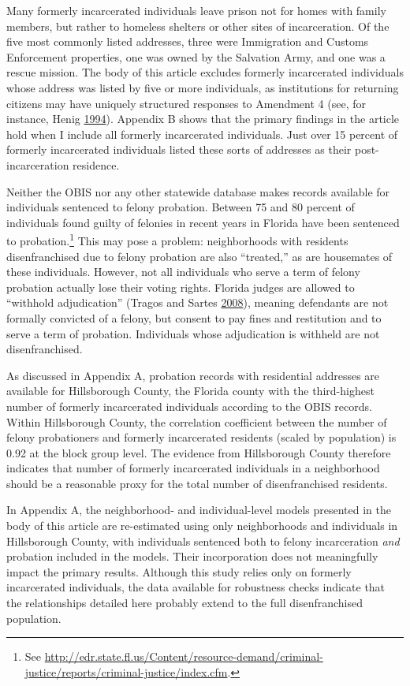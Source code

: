 \documentclass[
  12pt,
]{article}
\begin{document}
Many formerly incarcerated individuals leave prison not for homes with family members, but rather to homeless shelters or other sites of incarceration. Of the five most commonly listed addresses, three were Immigration and Customs Enforcement properties, one was owned by the Salvation Army, and one was a rescue mission. The body of this article excludes formerly incarcerated individuals whose address was listed by five or more individuals, as institutions for returning citizens may have uniquely structured responses to Amendment 4 (see, for instance, Henig \protect\hyperlink{ref-Henig1994}{1994}). Appendix B shows that the primary findings in the article hold when I include all formerly incarcerated individuals. Just over 15 percent of formerly incarcerated individuals listed these sorts of addresses as their post-incarceration residence.

Neither the OBIS nor any other statewide database makes records available for individuals sentenced to felony probation. Between 75 and 80 percent of individuals found guilty of felonies in recent years in Florida have been sentenced to probation.\footnote{See \url{http://edr.state.fl.us/Content/resource-demand/criminal-justice/reports/criminal-justice/index.cfm}.} This may pose a problem: neighborhoods with residents disenfranchised due to felony probation are also ``treated,'' as are housemates of these individuals. However, not all individuals who serve a term of felony probation actually lose their voting rights. Florida judges are allowed to ``withhold adjudication'' (Tragos and Sartes \protect\hyperlink{ref-Tragos2008}{2008}), meaning defendants are not formally convicted of a felony, but consent to pay fines and restitution and to serve a term of probation. Individuals whose adjudication is withheld are not disenfranchised.

As discussed in Appendix A, probation records with residential addresses are available for Hillsborough County, the Florida county with the third-highest number of formerly incarcerated individuals according to the OBIS records. Within Hillsborough County, the correlation coefficient between the number of felony probationers and formerly incarcerated residents (scaled by population) is 0.92 at the block group level. The evidence from Hillsborough County therefore indicates that number of formerly incarcerated individuals in a neighborhood should be a reasonable proxy for the total number of disenfranchised residents.

In Appendix A, the neighborhood- and individual-level models presented in the body of this article are re-estimated using only neighborhoods and individuals in Hillsborough County, with individuals sentenced both to felony incarceration \emph{and} probation included in the models. Their incorporation does not meaningfully impact the primary results. Although this study relies only on formerly incarcerated individuals, the data available for robustness checks indicate that the relationships detailed here probably extend to the full disenfranchised population.
\end{document}
